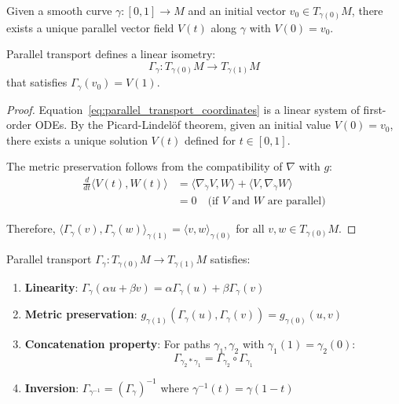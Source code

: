 \begin{theorem}\label{thm:existence_parallel_transport}
Given a smooth curve $\gamma: [0,1] \to M$ and an initial vector $v_0 \in T_{\gamma(0)}M$, there exists a unique parallel vector field $V(t)$ along $\gamma$ with $V(0) = v_0$.

Parallel transport defines a linear isometry:
\begin{equation}
\Gamma_\gamma: T_{\gamma(0)}M \to T_{\gamma(1)}M
\end{equation}
that satisfies $\Gamma_\gamma(v_0) = V(1)$.
\end{theorem}

\begin{proof}
Equation~\eqref{eq:parallel_transport_coordinates} is a linear system of first-order ODEs. By the Picard-Lindelöf theorem, given an initial value $V(0) = v_0$, there exists a unique solution $V(t)$ defined for $t \in [0,1]$.

The metric preservation follows from the compatibility of $\nabla$ with $g$:
\begin{align}
\frac{d}{dt}\langle V(t), W(t) \rangle &= \langle \nabla_{\dot{\gamma}} V, W \rangle + \langle V, \nabla_{\dot{\gamma}} W \rangle \\
&= 0 \quad \text{(if $V$ and $W$ are parallel)}
\end{align}

Therefore, $\langle \Gamma_\gamma(v), \Gamma_\gamma(w) \rangle_{\gamma(1)} = \langle v, w \rangle_{\gamma(0)}$ for all $v, w \in T_{\gamma(0)}M$.
\end{proof}

\begin{proposition}\label{prop:parallel_transport_properties}
Parallel transport $\Gamma_\gamma: T_{\gamma(0)}M \to T_{\gamma(1)}M$ satisfies:

\begin{enumerate}
    \item \textbf{Linearity}: $\Gamma_\gamma(\alpha u + \beta v) = \alpha \Gamma_\gamma(u) + \beta \Gamma_\gamma(v)$
    \item \textbf{Metric preservation}: $g_{\gamma(1)}(\Gamma_\gamma(u), \Gamma_\gamma(v)) = g_{\gamma(0)}(u, v)$
    \item \textbf{Concatenation property}: For paths $\gamma_1, \gamma_2$ with $\gamma_1(1) = \gamma_2(0)$:
    \begin{equation}
    \Gamma_{\gamma_2 * \gamma_1} = \Gamma_{\gamma_2} \circ \Gamma_{\gamma_1}
    \end{equation}
    \item \textbf{Inversion}: $\Gamma_{\gamma^{-1}} = (\Gamma_\gamma)^{-1}$ where $\gamma^{-1}(t) = \gamma(1-t)$
\end{enumerate}
\end{proposition}

